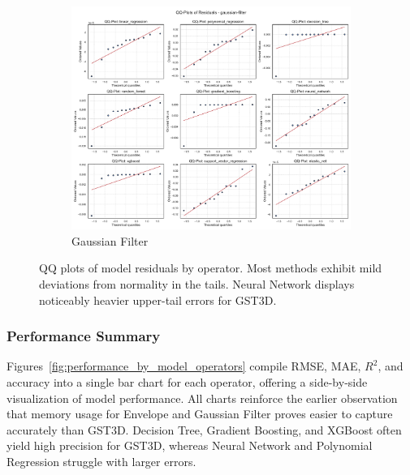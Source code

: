 \begin{figure}[htbp]
\begin{subfigure}[t]{0.32\textwidth}
        \includegraphics[width=\textwidth]{assets/images/05/residual_qq_plots_gaussian-filter}
        \caption{Gaussian Filter}
    \end{subfigure}
    \caption{\ac{QQ} plots of model residuals by operator.
    Most methods exhibit mild deviations from normality in the tails.
    Neural Network displays noticeably heavier upper-tail errors for \ac{GST3D}.
    \label{fig:residual_qq_plots}
    }
\end{figure}

\subsubsection{Performance Summary}
\label{subsec:performance-summary}

Figures~\ref{fig:performance_by_model_operators} compile \ac{RMSE}, \ac{MAE}, $R^2$, and accuracy into a single bar chart for each operator, offering a side-by-side visualization of model performance.
All charts reinforce the earlier observation that memory usage for Envelope and Gaussian Filter proves easier to capture accurately than \ac{GST3D}.
Decision Tree, Gradient Boosting, and XGBoost often yield high precision for \ac{GST3D}, whereas Neural Network and Polynomial Regression struggle with larger errors.

